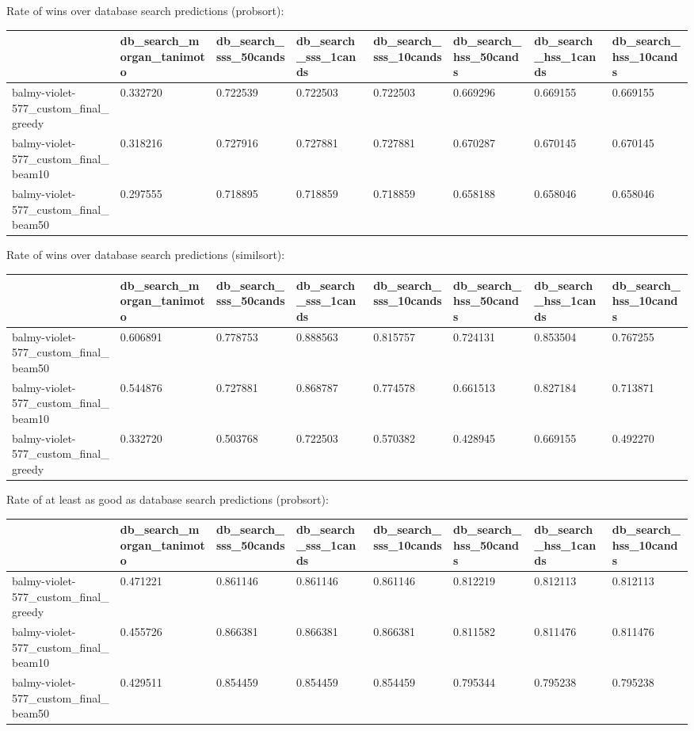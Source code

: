 Rate of wins over database search predictions (probsort):
\begin{tabular}{llllllll}
\toprule
 & db_search_morgan_tanimoto & db_search_sss_50cands & db_search_sss_1cands & db_search_sss_10cands & db_search_hss_50cands & db_search_hss_1cands & db_search_hss_10cands \\
\midrule
balmy-violet-577_custom_final_greedy & 0.332720 & 0.722539 & 0.722503 & 0.722503 & 0.669296 & 0.669155 & 0.669155 \\
balmy-violet-577_custom_final_beam10 & 0.318216 & 0.727916 & 0.727881 & 0.727881 & 0.670287 & 0.670145 & 0.670145 \\
balmy-violet-577_custom_final_beam50 & 0.297555 & 0.718895 & 0.718859 & 0.718859 & 0.658188 & 0.658046 & 0.658046 \\
\bottomrule
\end{tabular}



Rate of wins over database search predictions (similsort):
\begin{tabular}{llllllll}
\toprule
 & db_search_morgan_tanimoto & db_search_sss_50cands & db_search_sss_1cands & db_search_sss_10cands & db_search_hss_50cands & db_search_hss_1cands & db_search_hss_10cands \\
\midrule
balmy-violet-577_custom_final_beam50 & 0.606891 & 0.778753 & 0.888563 & 0.815757 & 0.724131 & 0.853504 & 0.767255 \\
balmy-violet-577_custom_final_beam10 & 0.544876 & 0.727881 & 0.868787 & 0.774578 & 0.661513 & 0.827184 & 0.713871 \\
balmy-violet-577_custom_final_greedy & 0.332720 & 0.503768 & 0.722503 & 0.570382 & 0.428945 & 0.669155 & 0.492270 \\
\bottomrule
\end{tabular}



Rate of at least as good as database search predictions (probsort):
\begin{tabular}{llllllll}
\toprule
 & db_search_morgan_tanimoto & db_search_sss_50cands & db_search_sss_1cands & db_search_sss_10cands & db_search_hss_50cands & db_search_hss_1cands & db_search_hss_10cands \\
\midrule
balmy-violet-577_custom_final_greedy & 0.471221 & 0.861146 & 0.861146 & 0.861146 & 0.812219 & 0.812113 & 0.812113 \\
balmy-violet-577_custom_final_beam10 & 0.455726 & 0.866381 & 0.866381 & 0.866381 & 0.811582 & 0.811476 & 0.811476 \\
balmy-violet-577_custom_final_beam50 & 0.429511 & 0.854459 & 0.854459 & 0.854459 & 0.795344 & 0.795238 & 0.795238 \\
\bottomrule
\end{tabular}



